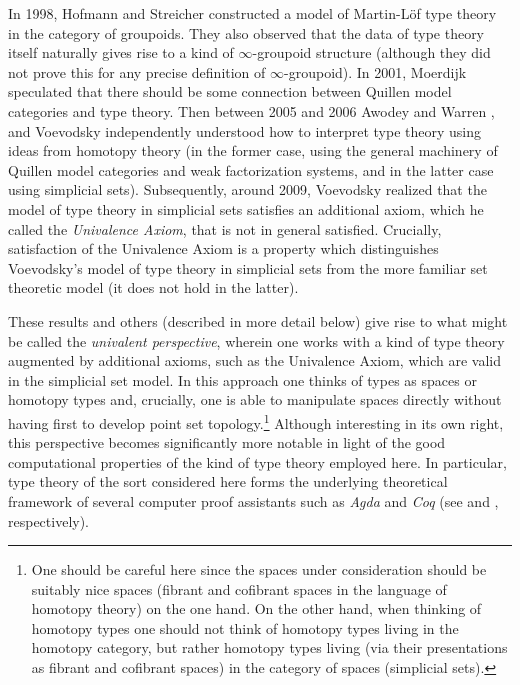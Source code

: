 \documentclass{amsart}
\theoremstyle{definition}
\theoremstyle{remark}
\numberwithin{equation}{section}
\begin{document}
In 1998, Hofmann and Streicher \cite{Hofmann:1998ty} constructed a model
of Martin-L\"{o}f type theory in the category of
groupoids.  They also observed that the data of type theory
itself naturally gives rise to a kind of $\infty$-groupoid structure (although they did not prove this for any precise
definition of $\infty$-groupoid).  In 2001, Moerdijk
speculated that there should be some connection between Quillen model
categories and type theory.  Then between 2005 and 2006 Awodey
and Warren \cite{Awodey:2009bz,Warren:2006vf,Warren:2008ts}, and
Voevodsky \cite{Voevodsky:VSNHLC,Voevodsky:2009,Vo2012a,Vo2012} independently understood how to
interpret type theory using ideas from homotopy theory (in the
former case, using the general machinery of Quillen model categories
and weak factorization systems, and in the latter case using
simplicial sets).  Subsequently, around 2009, Voevodsky
\cite{Voevodsky:2009} realized that
the model of type theory in simplicial sets satisfies an additional
axiom, which he called the \emph{Univalence Axiom}, that is not in general
satisfied.  Crucially, satisfaction of the Univalence Axiom is a
property which distinguishes Voevodsky's model of type theory in
simplicial sets from the more familiar set theoretic model (it does
not hold in the latter).

These results and others (described in more detail below) give rise to
what might be called the \emph{univalent perspective}, wherein one
works with a kind of type theory augmented by additional axioms, such as the
Univalence Axiom, which are valid in the simplicial set model.  In
this approach one thinks of types as spaces or homotopy
types and, crucially, one is able to manipulate spaces directly
without having first to develop point set topology.\footnote{One
  should be careful here since the spaces
  under consideration should be suitably nice spaces (fibrant and
  cofibrant spaces in the language of homotopy theory) on the one
  hand.  On the other hand, when thinking of homotopy types one should
  not think of homotopy types living in the homotopy category, but
  rather homotopy types living (via their presentations as fibrant and
  cofibrant spaces) in the category of spaces (simplicial sets).}  Although
interesting in its own right, this perspective becomes significantly
more notable in light of the good computational properties of the
kind of type theory employed here.  In particular, type theory of
the sort considered here forms the underlying theoretical framework
of several computer proof assistants such as \emph{Agda} and
\emph{Coq} (see \cite{Coquand} and \cite{Bertot:2004uj},
respectively).  
\end{document}
